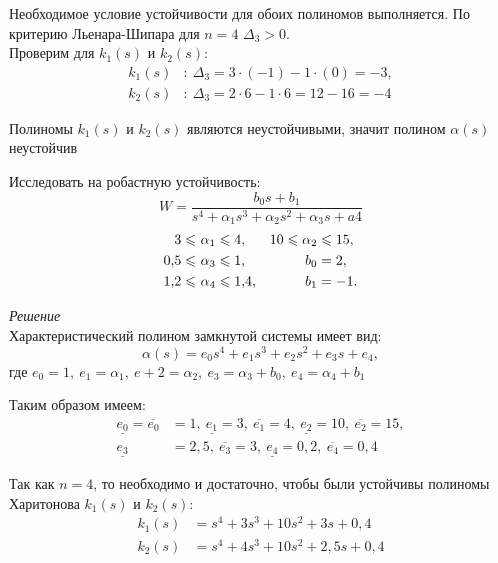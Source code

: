 \documentclass[../../TAU.tex]{subfiles}
\begin{document}
    Необходимое условие устойчивости для обоих полиномов выполняется. По критерию Льенара-Шипара для $n=4$ $\Delta_3>0$.\\
    Проверим для ${k}_1(s)$ и ${k}_2(s)$:
    \begin{align*}
        {k}_1(s)&:\ \Delta_3=3\cdot(-1)-1\cdot(0)=-3,\\
        {k}_2(s)&:\ \Delta_3=2\cdot6-1\cdot6=12-16=-4
    \end{align*}

    Полиномы ${k}_1(s)$ и ${k}_2(s)$ являются неустойчивыми, значит полином $\alpha(s)$ неустойчив

    \examp Исследовать на робастную устойчивость:
    $$
    W=\frac{b_0s+b_1}{s^4+\alpha_1s^3+\alpha_2s^2+\alpha_3s+a4}
    $$
    \begin{align*}
        3\leqslant\ &\alpha_1\leqslant4, & 10\leqslant \alpha_2&\leqslant15, \\
        0{,}5\leqslant\ &\alpha_3\leqslant1, & b_0&=2, \\
        1{,}2\leqslant\ &\alpha_4\leqslant1{,}4, & b_1&=-1.
    \end{align*}

    {\it Решение}\\
    Характеристический полином замкнутой системы имеет вид:
    $$
        \alpha(s)=e_0s^4+e_1s^3+e_2s^2+e_3s+e_4,
    $$    
    где 
    $e_0=1,\ e_1=\alpha_1,\ e+2 =\alpha_2,\ e_3=\alpha_3+b_0,\ e_4=\alpha_4+b_1$

    Таким образом имеем:
    \begin{align*}
        \underline{e_0}=\overline{e_0}&=1,\ 
        \underline{e_1}=3,\ \overline{e_1}=4,\
        \underline{e_2}=10,\ \overline{e_2}=15,\\
        \underline{e_3}&=2{,}5,\ \overline{e_3}=3,\ 
        \underline{e_4}=0{,}2,\ \overline{e_4}=0{,}4
    \end{align*}

    Так как $n=4$, то необходимо и достаточно, чтобы были устойчивы полиномы  Харитонова 
    ${k}_1(s)$ и ${k}_2(s)$:
    \begin{align*}
        k_1(s)&=s^4+3s^3+10s^2+3s+0{,}4\\
        k_2(s)&=s^4+4s^3+10s^2+2{,}5s+0{,}4
    \end{align*}
\end{document}
